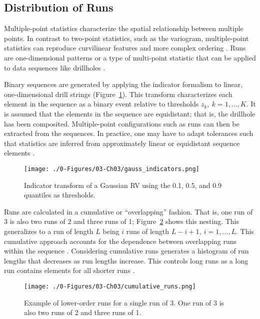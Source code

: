 \FloatBarrier
\subsection{Distribution of Runs}
\label{subsec:03runs}

Multiple-point statistics characterize the spatial relationship between multiple points. In contrast to two-point statistics, such as the variogram, multiple-point statistics can reproduce curvilinear features and more complex ordering \citep{guardiano1993multivariate}. Runs are one-dimensional patterns or a type of multi-point statistic that can be applied to data sequences like drillholes \citep{boisvert2007multiplepoint}.

Binary sequences are generated by applying the indicator formalism to linear, one-dimensional drill strings (Figure~\ref{fig:gauss_indicators}). This transform characterizes each element in the sequence as a binary event relative to thresholds $z_{k}, \ k=1,\dots,K$. It is assumed that the elements in the sequence are equidistant; that is, the drillhole has been composited. Multiple-point configurations such as runs can then be extracted from the sequences. In practice, one may have to adapt tolerances such that statistics are inferred from approximately linear or equidistant sequence elements \citep{ortiz2003characterization}.

\begin{figure}[htb!]
    \centering
    \texttt{[image: ./0-Figures/03-Ch03/gauss\_indicators.png]}
    \caption{Indicator transform of a Gaussian \gls{RV} using the 0.1, 0.5, and 0.9 quantiles as thresholds. }
    \label{fig:gauss_indicators}
\end{figure}

Runs are calculated in a cumulative or ``overlapping'' fashion. That is, one run of 3 is also two runs of 2 and three runs of 1; Figure~\ref{fig:cumulative_runs} shows this nesting. This generalizes to a run of length $L$ being $i$ runs of length $L-i+1, \ i=1,\dots,L$. This cumulative approach accounts for the dependence between overlapping runs within the sequence \citep{mood1940distribution}. Considering cumulative runs generates a histogram of run lengths that decreases as run lengths increase. This controls long runs as a long run contains elements for all shorter runs \citep{ortiz2003characterization}.

\begin{figure}[htb!]
    \centering
    \texttt{[image: ./0-Figures/03-Ch03/cumulative\_runs.png]}
    \caption{Example of lower-order runs for a single run of 3. One run of 3 is also two runs of 2 and three runs of 1.}
    \label{fig:cumulative_runs}
\end{figure}

